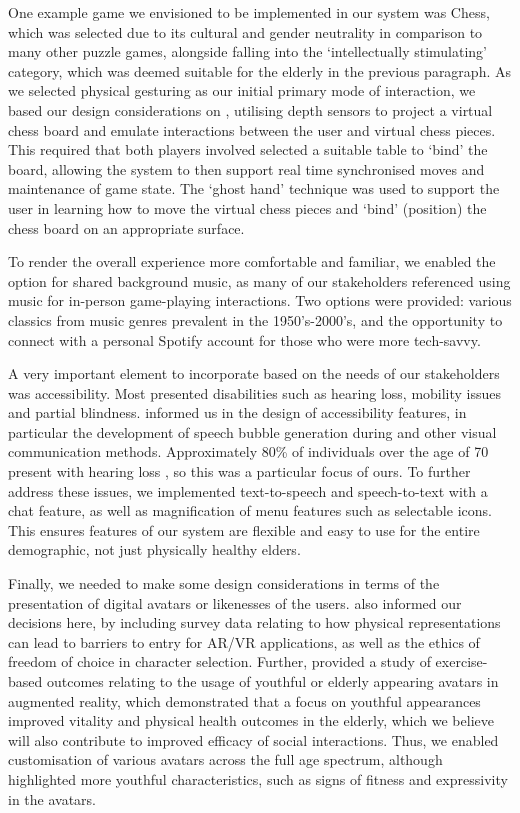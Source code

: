 \documentclass[12pt,a4paper]{article}
\begin{document}
One example game we envisioned to be implemented in our system was Chess, which was selected due to its cultural and gender neutrality in comparison to many other puzzle games, alongside falling into the ‘intellectually stimulating’ category, which was deemed suitable for the elderly in the previous paragraph. As we selected physical gesturing as our initial primary mode of interaction, we based our design considerations on \cite{Bikos_2015}, utilising depth sensors to project a virtual chess board and emulate interactions between the user and virtual chess pieces. This required that both players involved selected a suitable table to ‘bind’ the board, allowing the system to then support real time synchronised moves and maintenance of game state. The ‘ghost hand’ technique was used to support the user in learning how to move the virtual chess pieces and ‘bind’ (position) the chess board on an appropriate surface. 

To render the overall experience more comfortable and familiar, we enabled the option for shared background music, as many of our stakeholders referenced using music for in-person game-playing interactions. Two options were provided: various classics from music genres prevalent in the 1950’s-2000’s, and the opportunity to connect with a personal Spotify account for those who were more tech-savvy. 

A very important element to incorporate based on the needs of our stakeholders was accessibility. Most presented disabilities such as hearing loss, mobility issues and partial blindness. \cite{Chris_2023} informed us in the design of accessibility features, in particular the development of speech bubble generation during and other visual communication methods. Approximately 80\% of individuals over the age of 70 present with hearing loss \cite{Michael_2024}, so this was a particular focus of ours. To further address these issues, we implemented text-to-speech and speech-to-text with a chat feature, as well as magnification of menu features such as selectable icons. This ensures features of our system are flexible and easy to use for the entire demographic, not just physically healthy elders.  

Finally, we needed to make some design considerations in terms of the presentation of digital avatars or likenesses of the users. \cite{Chris_2023} also informed our decisions here, by including survey data relating to how physical representations can lead to barriers to entry for AR/VR applications, as well as the ethics of freedom of choice in character selection. Further, \cite{Lin_2021} provided a study of exercise-based outcomes relating to the usage of youthful or elderly appearing avatars in augmented reality, which demonstrated that a focus on youthful appearances improved vitality and physical health outcomes in the elderly, which we believe will also contribute to improved efficacy of social interactions. Thus, we enabled customisation of various avatars across the full age spectrum, although highlighted more youthful characteristics, such as signs of fitness and expressivity in the avatars. 
\end{document}
